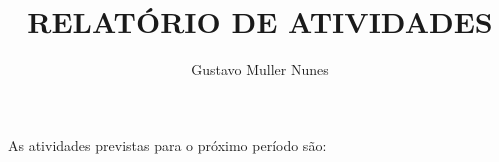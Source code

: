 \documentclass[11pt,a4paper]{report}
\begin{document}
\title{RELATÓRIO DE ATIVIDADES}
\author{Gustavo Muller Nunes}
\maketitle

As atividades previstas para o próximo período são: \\


\end{document}
